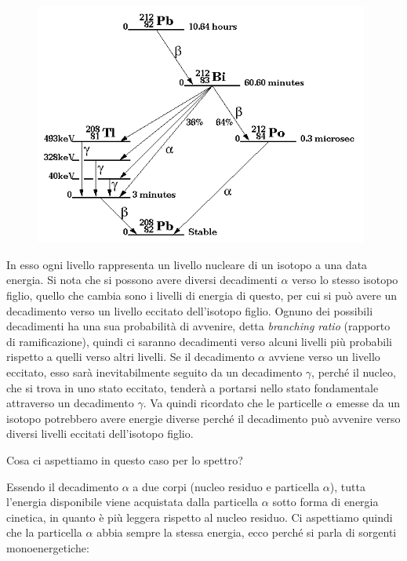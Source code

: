 \begin{figure}[H]
    \centering
    \includegraphics[width=11cm]{immagini/schema_decadimento_alfa.png}
\end{figure}

\vspace{-0.5cm}In esso ogni livello rappresenta un livello nucleare di un isotopo a una data energia. Si nota che si possono avere diversi decadimenti $\alpha$ verso lo stesso isotopo figlio, quello che cambia sono i livelli di energia di questo, per cui si può avere un decadimento verso un livello eccitato dell'isotopo figlio. Ognuno dei possibili decadimenti ha una sua probabilità di avvenire, detta \textit{branching ratio} (rapporto di ramificazione), quindi ci saranno decadimenti verso alcuni livelli più probabili rispetto a quelli verso altri livelli. Se il decadimento $\alpha$ avviene verso un livello eccitato, esso sarà inevitabilmente seguito da un decadimento $\gamma$, perché il nucleo, che si trova in uno stato eccitato, tenderà a portarsi nello stato fondamentale attraverso un decadimento $\gamma$. Va quindi ricordato che le particelle $\alpha$ emesse da un isotopo potrebbero avere energie diverse perché il decadimento può avvenire verso diversi livelli eccitati dell'isotopo figlio.

\vspace{0.2cm}Cosa ci aspettiamo in questo caso per lo spettro?

Essendo il decadimento $\alpha$ a due corpi (nucleo residuo e particella $\alpha$), tutta l'energia disponibile viene acquistata dalla particella $\alpha$ sotto forma di energia cinetica, in quanto è più leggera rispetto al nucleo residuo. Ci aspettiamo quindi che la particella $\alpha$ abbia sempre la stessa energia, ecco perché si parla di sorgenti monoenergetiche:

